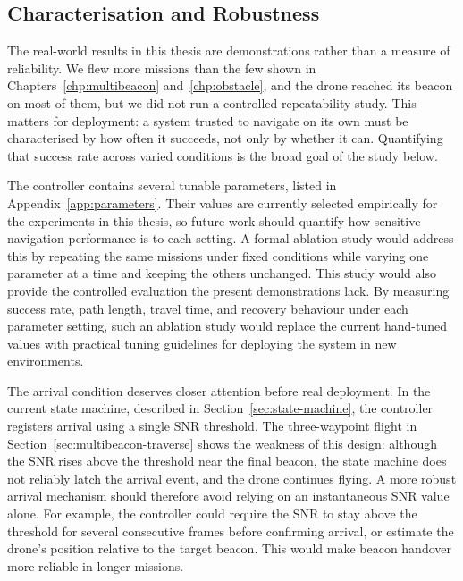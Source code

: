 \subsection{Characterisation and Robustness}
\label{sec:fw-characterisation}

The real-world results in this thesis are demonstrations rather than a measure of reliability. We flew more missions than the few shown in Chapters~\ref{chp:multibeacon} and~\ref{chp:obstacle}, and the drone reached its beacon on most of them, but we did not run a controlled repeatability study. This matters for deployment: a system trusted to navigate on its own must be characterised by how often it succeeds, not only by whether it can. Quantifying that success rate across varied conditions is the broad goal of the study below.

The controller contains several tunable parameters, listed in Appendix~\ref{app:parameters}. Their values are currently selected empirically for the experiments in this thesis, so future work should quantify how sensitive navigation performance is to each setting. A formal ablation study would address this by repeating the same missions under fixed conditions while varying one parameter at a time and keeping the others unchanged. This study would also provide the controlled evaluation the present demonstrations lack. By measuring success rate, path length, travel time, and recovery behaviour under each parameter setting, such an ablation study would replace the current hand-tuned values with practical tuning guidelines for deploying the system in new environments.

The arrival condition deserves closer attention before real deployment. In the current state machine, described in Section~\ref{sec:state-machine}, the controller registers arrival using a single SNR threshold. The three-waypoint flight in Section~\ref{sec:multibeacon-traverse} shows the weakness of this design: although the SNR rises above the threshold near the final beacon, the state machine does not reliably latch the arrival event, and the drone continues flying. A more robust arrival mechanism should therefore avoid relying on an instantaneous SNR value alone. For example, the controller could require the SNR to stay above the threshold for several consecutive frames before confirming arrival, or estimate the drone's position relative to the target beacon. This would make beacon handover more reliable in longer missions.

